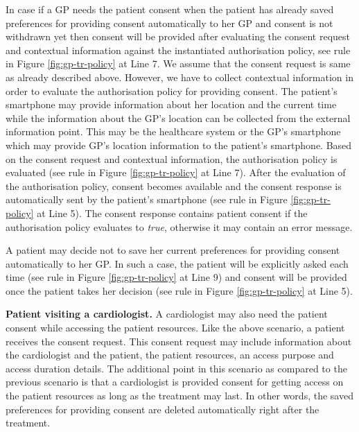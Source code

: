 \documentclass[10pt, conference, compsocconf]{IEEEtran}
\begin{document}
In case if a GP needs the patient consent when the patient has already saved preferences for providing consent automatically to her GP and consent is not withdrawn yet then consent will be provided after evaluating the consent request and contextual information against the instantiated authorisation policy, see rule in Figure \ref{fig:gp-tr-policy} at Line 7. We assume that the consent request is same as already described above. However, we have to collect contextual information in order to evaluate the authorisation policy for providing consent. The patient's smartphone may provide information about her location and the current time while the information about the GP's location can be collected from the external information point. This may be the healthcare system or the GP's smartphone which may provide GP's location information to the patient's smartphone. Based on the consent request and contextual information, the authorisation policy is evaluated (see rule in Figure \ref{fig:gp-tr-policy} at Line 7). After the evaluation of the authorisation policy, consent becomes available and the consent response is automatically sent by the patient's smartphone (see rule in Figure \ref{fig:gp-tr-policy} at Line 5). The consent response contains patient consent if the authorisation policy evaluates to \emph{true}, otherwise it may contain an error message.

A patient may decide not to save her current preferences for providing consent automatically to her GP. In such a case, the patient will be explicitly asked each time (see rule in Figure \ref{fig:gp-tr-policy} at Line 9) and consent will be provided once the patient takes her decision (see rule in Figure \ref{fig:gp-tr-policy} at Line 5).


\textbf{Patient visiting a cardiologist.}
A cardiologist may also need the patient consent while accessing the patient resources. Like the above scenario, a patient receives the consent request. This consent request may include information about the cardiologist and the patient, the patient resources, an access purpose and access duration details. The additional point in this scenario as compared to the previous scenario is that a cardiologist is provided consent for getting access on the patient resources as long as the treatment may last. In other words, the saved preferences for providing consent are deleted automatically right after the treatment.
\end{document}
